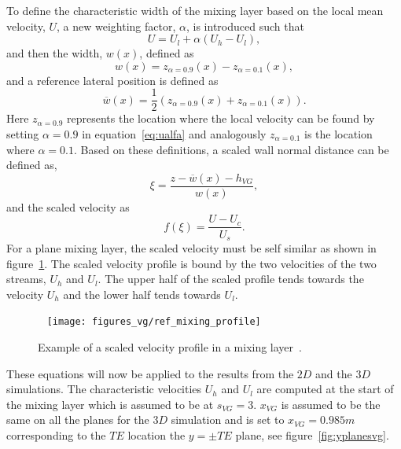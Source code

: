 To define the characteristic width of the mixing layer based on the local mean velocity, $U$, a new weighting factor, $\alpha$, is introduced such that
\begin{equation}
U = U_l + \alpha(U_h - U_l),\label{eq:ualfa}
\end{equation}
and then the width, $w(x)$, defined as
\begin{equation}
w(x) = z_{\alpha=0.9}(x) - z_{\alpha=0.1}(x),
\end{equation}
and a reference lateral position is defined as
\begin{equation}
\overline{w}(x) = \frac{1}{2}(z_{\alpha=0.9}(x) + z_{\alpha=0.1}(x)).
\end{equation}
Here $z_{\alpha=0.9}$ represents the location where the local velocity can be found by setting $\alpha =0.9$ in equation~\ref{eq:ualfa} and analogously $z_{\alpha=0.1}$ is the location where $\alpha=0.1$. Based on these definitions, a scaled wall normal distance can be defined as,
\begin{equation}
\xi = \frac{z - \overline{w}(x) - h_{VG}}{w(x)},
\end{equation}
and the scaled velocity as
\begin{equation}
f(\xi) = \frac{U - U_c}{U_s}.
\end{equation}
For a plane mixing layer, the scaled velocity must be self similar as shown in figure~\ref{fig:refmix2}. The scaled velocity profile is bound by the two velocities of the two streams, $U_h$ and $U_l$. The upper half of the scaled profile tends towards the velocity $U_h$ and the lower half tends towards $U_l$. 
\begin{figure}[h!]
    \centering
    \captionsetup{justification=centering}
    ~ %
       \texttt{[image: figures\_vg/ref\_mixing\_profile]}
        \caption{Example of a scaled velocity profile in a mixing layer~\cite{pope_2000}.}
        \label{fig:refmix2}
\end{figure}
These equations will now be applied to the results from the $2D$ and the $3D$ simulations. The characteristic velocities $U_h$ and $U_l$ are computed at the start of the mixing layer which is assumed to be at $s_{VG}=3$. $x_{VG}$ is assumed to be the same on all the planes for the $3D$ simulation and is set to $x_{VG}=0.985m$ corresponding to the $TE$ location the $y=\pm TE$ plane, see figure~\ref{fig:yplanesvg}.

